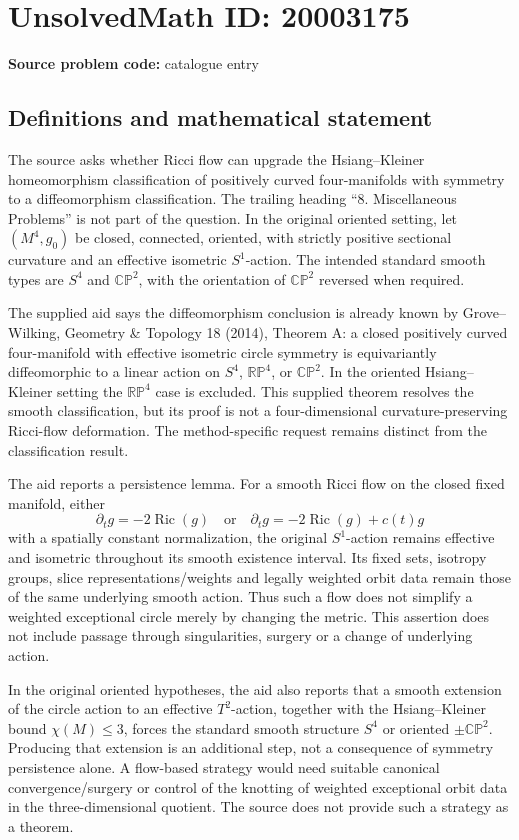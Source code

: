 \documentclass[11pt]{article}
\newcommand{\R}{\mathbb{R}}
\newcommand{\C}{\mathbb{C}}
\newcommand{\PP}{\mathbb{P}}
\begin{document}
\section*{UnsolvedMath ID: 20003175}
\textbf{Source problem code:} catalogue entry
\subsection{Definitions and mathematical statement}
The source asks whether Ricci flow can upgrade the Hsiang--Kleiner homeomorphism classification of positively curved four-manifolds with symmetry to a diffeomorphism classification. The trailing heading ``8. Miscellaneous Problems'' is not part of the question. In the original oriented setting, let \((M^4,g_0)\) be closed, connected, oriented, with strictly positive sectional curvature and an effective isometric \(S^1\)-action. The intended standard smooth types are \(S^4\) and \(\C\PP^2\), with the orientation of \(\C\PP^2\) reversed when required.

The supplied aid says the diffeomorphism conclusion is already known by Grove--Wilking, Geometry \& Topology 18 (2014), Theorem A: a closed positively curved four-manifold with effective isometric circle symmetry is equivariantly diffeomorphic to a linear action on \(S^4\), \(\R\PP^4\), or \(\C\PP^2\). In the oriented Hsiang--Kleiner setting the \(\R\PP^4\) case is excluded. This supplied theorem resolves the smooth classification, but its proof is not a four-dimensional curvature-preserving Ricci-flow deformation. The method-specific request remains distinct from the classification result.

The aid reports a persistence lemma. For a smooth Ricci flow on the closed fixed manifold, either
\[
\partial_tg=-2\operatorname{Ric}(g)
\quad\text{or}\quad
\partial_tg=-2\operatorname{Ric}(g)+c(t)g
\]
with a spatially constant normalization, the original \(S^1\)-action remains effective and isometric throughout its smooth existence interval. Its fixed sets, isotropy groups, slice representations/weights and legally weighted orbit data remain those of the same underlying smooth action. Thus such a flow does not simplify a weighted exceptional circle merely by changing the metric. This assertion does not include passage through singularities, surgery or a change of underlying action.

In the original oriented hypotheses, the aid also reports that a smooth extension of the circle action to an effective \(T^2\)-action, together with the Hsiang--Kleiner bound \(\chi(M)\le3\), forces the standard smooth structure \(S^4\) or oriented \(\pm\C\PP^2\). Producing that extension is an additional step, not a consequence of symmetry persistence alone. A flow-based strategy would need suitable canonical convergence/surgery or control of the knotting of weighted exceptional orbit data in the three-dimensional quotient. The source does not provide such a strategy as a theorem.
\end{document}
